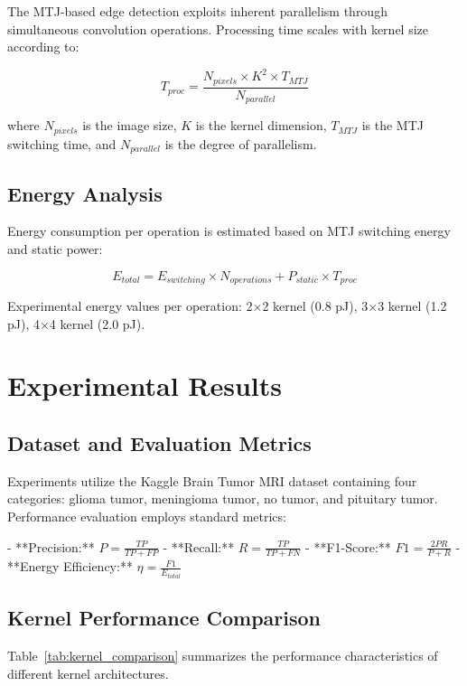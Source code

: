\documentclass[conference]{IEEEtran}
\begin{document}
The MTJ-based edge detection exploits inherent parallelism through simultaneous convolution operations. Processing time scales with kernel size according to:

\begin{equation}
T_{proc} = \frac{N_{pixels} \times K^2 \times T_{MTJ}}{N_{parallel}}
\label{eq:processing_time}
\end{equation}

where $N_{pixels}$ is the image size, $K$ is the kernel dimension, $T_{MTJ}$ is the MTJ switching time, and $N_{parallel}$ is the degree of parallelism.

\subsection{Energy Analysis}

Energy consumption per operation is estimated based on MTJ switching energy and static power:

\begin{equation}
E_{total} = E_{switching} \times N_{operations} + P_{static} \times T_{proc}
\label{eq:energy}
\end{equation}

Experimental energy values per operation: 2×2 kernel (0.8 pJ), 3×3 kernel (1.2 pJ), 4×4 kernel (2.0 pJ).

\section{Experimental Results}

\subsection{Dataset and Evaluation Metrics}

Experiments utilize the Kaggle Brain Tumor MRI dataset containing four categories: glioma tumor, meningioma tumor, no tumor, and pituitary tumor. Performance evaluation employs standard metrics:

- **Precision:** $P = \frac{TP}{TP + FP}$
- **Recall:** $R = \frac{TP}{TP + FN}$
- **F1-Score:** $F1 = \frac{2PR}{P + R}$
- **Energy Efficiency:** $\eta = \frac{F1}{E_{total}}$

\subsection{Kernel Performance Comparison}

Table~\ref{tab:kernel_comparison} summarizes the performance characteristics of different kernel architectures.
\end{document}
